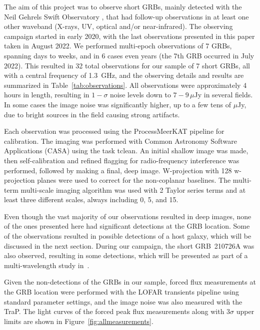 \documentclass[12pt]{article}
\begin{document}
The aim of this project was to observe short GRBs, mainly detected with the Neil Gehrels Swift Observatory \citep{2004ApJ...611.1005G}, that had follow-up observations in at least one other waveband (X-rays, UV, optical and/or near-infrared). The observing campaign started in early 2020, with the last observations presented in this paper taken in August 2022. We performed multi-epoch observations of 7 GRBs, spanning days to weeks, and in 6 cases even years (the 7th GRB occurred in July 2022). This resulted in 32 total observations for our sample of 7 short GRBs, all with a central frequency of 1.3~GHz, and the observing details and results are summarized in Table~\ref{tab:observations}. All observations were approximately 4 hours in length, resulting in $1-\sigma$ noise levels down to $7-9\,\mu$Jy in several fields. In some cases the image noise was significantly higher, up to a few tens of $\mu$Jy, due to bright sources in the field causing strong artifacts.

Each observation was processed using the ProcessMeerKAT pipeline \citep{pminprep} for calibration. The imaging was performed with Common Astronomy Software Applications (CASA) \citep{2022arXiv221002276T} using the task tclean. An initial shallow image was made, then self-calibration and refined flagging for radio-frequency interference was performed, followed by making a final, deep image. W-projection with 128 w-projection planes were used to correct for the non-coplanar baselines. The multi-term multi-scale imaging algorithm was used with 2 Taylor series terms and at least three different scales, always including 0, 5, and 15. 

Even though the vast majority of our observations resulted in deep images, none of the ones presented here had significant detections at the GRB location. Some of the observations resulted in possible detections of a host galaxy, which will be discussed in the next section. During our campaign, the short GRB~210726A was also observed, resulting in some detections, which will be presented as part of a multi-wavelength study in~\citep{grb210726ainprep}. 

Given the non-detections of the GRBs in our sample, forced flux measurements at the GRB location were performed with the LOFAR transients pipeline \citep[TraP;][]{2015A&C....11...25S} using standard parameter settings, and the image noise was also measured with the TraP. The light curves of the forced peak flux measurements along with $3\sigma$ upper limits are shown in Figure~\ref{fig:allmeasurements}. 
\end{document}
